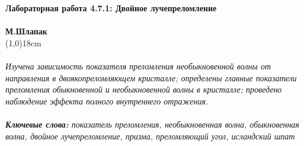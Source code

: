 \documentclass[a4paper]{article}
\begin{document}
 
\large
\noindent \textbf{Лабораторная работа 4.7.1: Двойное лучепреломление}\\
\\
\normalsize
\textbf{М.Шлапак}\\
\line(1,0){18cm}\\
\\
\footnotesize
\textit{Изучена зависимость показателя преломления необыкновенной волны от направления в двоякопреломляющем кристалле; определены главные показатели преломления обыкновенной и необыкновенной волны в кристалле; проведено наблюдение эффекта полного внутреннего отражения.}\\
\\
\textit{\textbf{Ключевые слова:} показатель преломления, необыкновенная волна, обыкновенная волна, двойное лучепреломление, призма, преломляющий угол, исландский шпат}\\
\end{document}
